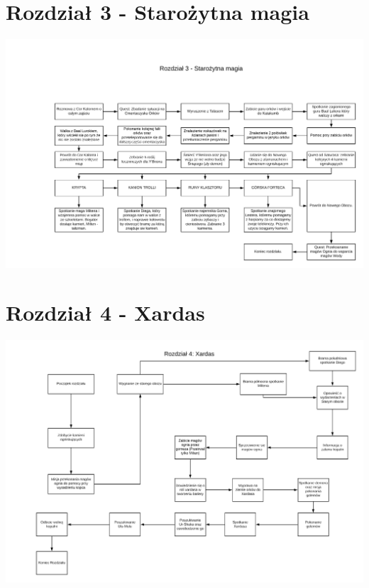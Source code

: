\documentclass[11pt,polish, openany]{book}
\begin{document}
\section{Rozdział 3 - Starożytna magia}
\begin{center}
\includegraphics[scale=0.16, angle=90]{rozdzial3}
\end{center}
\section{Rozdział 4 - Xardas}
\begin{center}
	\includegraphics[scale=0.16, angle=90]{4}
\end{center}
\end{document}
